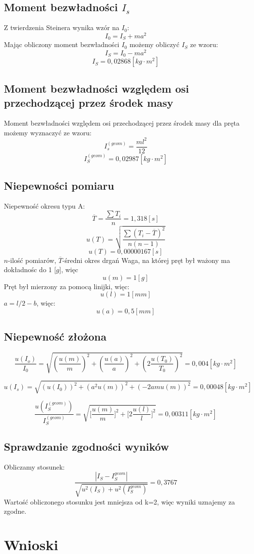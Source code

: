 \documentclass[a4paper,10pt,twoside]{article}
\begin{document}
	\subsection{Moment bezwładności $I_s$}
	Z twierdzenia Steinera wynika wzór na $I_0$:
	$$I_0=I_S+ma^2$$
	Mając obliczony moment bezwładności $I_0$ możemy obliczyć $I_S$ ze wzoru:
	$$I_S=I_0-ma^2$$
	$$I_S = 0,02868[\unit{kg\cdot m^2}]$$
	
	\subsection{Moment bezwładności względem osi przechodzącej przez środek masy}
	Moment bezwładności względem osi przechodzącej przez środek masy dla pręta możemy wyznaczyć ze wzoru:
	$$I_s^{(geom)}=\frac{ml^2}{12}$$
	$$I_S^{(geom)}=0,02987[\unit{kg\cdot m^2}]$$
	\subsection{Niepewności pomiaru}
	Niepewność okresu typu A:
	$$\overline{T}=\frac{\sum{T_i}}{n}=1,318[\unit{s}]$$
	$$u(T)=\sqrt{\frac{\sum{(T_i-\overline{T})^2}}{n(n-1)}}$$
	$$u(T)=0,00000167[\unit{s}]$$
	$n$-ilość pomiarów,
	$\overline{T}$-średni okres drgań
	\newline
	\newline
	Waga, na której pręt był ważony ma dokładnośc do 1 [$\unit{g}$], więc 
	$$u(m)=1[\unit{g}]$$
	\newline
	Pręt był mierzony za pomocą linijki, więc:
	$$u(l)=1[\unit{mm}]$$
	\newline
	$a = l/2-b$, więc:
	$$u(a)=0,5[\unit{mm}]$$
	\subsection{Niepewność złożona}
	
	$$\frac{u(I_o)}{I_0}=\sqrt{\left (\frac{u(m)}{m}\right ) ^2+\left ( \frac{u(a)}{a}\right )^2+\left (2 \frac{u(T_0)}{T_0}\right )^2}=0,004[\unit{kg\cdot m^2}]$$
	
	$$u(I_s)=\sqrt{\left( u(I_0)\right)^2+\left(a^2u(m) \right)^2+\left( -2amu(m)\right)^2}=0,00048[\unit{kg\cdot m^2}]$$
	
	$$\frac{u(I_S^{(geom)})}{I_S^{(geom)}}=\sqrt{{\big[\frac{u(m)}{m}\big]^2} + \big[2\frac{u(l)}{l}\big]^2}=0,00311[\unit{kg\cdot m^2}]$$
	\subsection{Sprawdzanie zgodności wyników}
	Obliczamy stosunek:
	$$\frac{|I_S-I_S^{geom}|}{\sqrt{u^2(I_S)+u^2(I_S^{geom})}}=0,3767 $$
	\newline
	Wartość obliczonego stosunku jest mniejsza od k=2, więc wyniki uznajemy za zgodne.
	\section{Wnioski}
	
	
\end{document}
